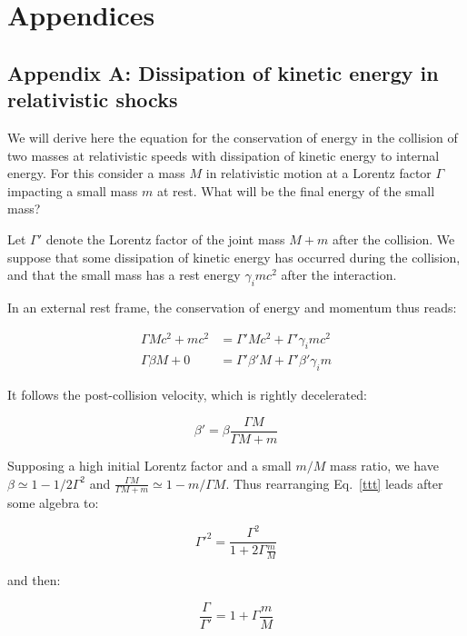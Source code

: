 \section*{Appendices}
\subsection*{Appendix A: Dissipation of kinetic energy in relativistic shocks}

We will derive here the equation for the conservation of energy in the collision of two masses at relativistic speeds with dissipation of kinetic energy to internal energy. For this consider a mass $M$ in relativistic motion at a Lorentz factor $\Gamma$ impacting a small mass $m$ at rest. What will be the final energy of the small mass?

Let $\Gamma'$ denote the Lorentz factor of the joint mass $M + m$ after the collision. We suppose that some dissipation of kinetic energy has occurred during the collision, and that the small mass has a rest energy $\gamma_i m c^2$ after the interaction.

In an external rest frame, the conservation of energy and momentum thus reads:

\begin{align}
    \Gamma Mc^2 + mc^2 &= \Gamma' Mc^2 + \Gamma' \gamma_i m c^2\\
    \Gamma \beta M + 0 &= \Gamma' \beta' M + \Gamma' \beta' \gamma_i m
\end{align}

It follows the post-collision velocity, which is rightly decelerated:

\begin{equation}\label{ttt}
    \beta' = \beta \frac{\Gamma M}{\Gamma M + m}
\end{equation}

Supposing a high initial Lorentz factor and a small $m/M$ mass ratio, we have $\beta \simeq 1 - 1/2\Gamma^2$ and $\frac{\Gamma M}{\Gamma M + m} \simeq 1 - m/\Gamma M$. Thus rearranging Eq.~\ref{ttt} leads after some algebra to:

\begin{equation}
    \Gamma'^2 = \frac{\Gamma ^ 2}{1 + 2\Gamma \frac{m}{M}}
\end{equation}

and then:

\begin{equation}
    \frac{\Gamma}{\Gamma'} = 1 + \Gamma \frac{m}{M}
\end{equation}

